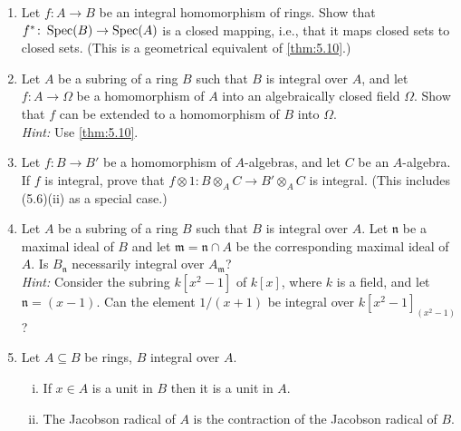
\begin{enumerate}
    \item \label{exer1-chapter5}Let $f \colon A \to B$ be an integral homomorphism of rings. Show that $f^* \colon \operatorname{Spec}(B) \to \operatorname{Spec}(A)$ is a closed mapping, i.e., that it maps closed sets to closed sets. (This is a geometrical equivalent of \eqref{thm:5.10}.)

    \item \label{exer2-chapter5}Let $A$ be a subring of a ring $B$ such that $B$ is integral over $A$, and let $f \colon A \to \Omega$ be a homomorphism of $A$ into an algebraically closed field $\Omega$. Show that $f$ can be extended to a homomorphism of $B$ into $\Omega$.\\
    \textit{Hint:} Use \eqref{thm:5.10}.

    \item \label{exer3-chapter5}Let $f \colon B \to B'$ be a homomorphism of $A$-algebras, and let $C$ be an $A$-algebra. If $f$ is integral, prove that $f \otimes 1 \colon B \otimes_A C \to B' \otimes_A C$ is integral. (This includes (5.6)(ii) as a special case.)

    \item \label{exer4-chapter5}Let $A$ be a subring of a ring $B$ such that $B$ is integral over $A$. Let $\mathfrak{n}$ be a maximal ideal of $B$ and let $\mathfrak{m} = \mathfrak{n} \cap A$ be the corresponding maximal ideal of $A$. Is $B_{\mathfrak{n}}$ necessarily integral over $A_{\mathfrak{m}}$?\\
    \textit{Hint:} Consider the subring $k[x^2 - 1]$ of $k[x]$, where $k$ is a field, and let $\mathfrak{n} = (x - 1)$. Can the element $1/(x + 1)$ be integral over $k[x^2 - 1]_{(x^2-1)}$?

    \item \label{exer5-chapter5}Let $A \subseteq B$ be rings, $B$ integral over $A$.
    \begin{enumerate}[i)]
        \item If $x \in A$ is a unit in $B$ then it is a unit in $A$.
        \item The Jacobson radical of $A$ is the contraction of the Jacobson radical of $B$.
    \end{enumerate}


\end{enumerate}
